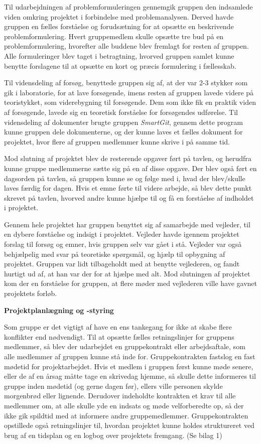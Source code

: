 Til udarbejdningen af problemformuleringen gennemgik gruppen den indsamlede viden omkring projektet i forbindelse med problemanalysen. Derved havde gruppen en fælles forståelse og forudsætning for at opsætte en beskrivende problemformulering. Hvert gruppemedlem skulle opsætte tre bud på en problemformulering, hvorefter alle buddene blev fremlagt for resten af gruppen. Alle formuleringer blev taget i betragtning, hvorved gruppen samlet kunne benytte forslagene til at opsætte en kort og præcis formulering i fællesskab.

Til vidensdeling af forsøg, benyttede gruppen sig af, at der var 2-3 stykker som gik i laboratorie, for at lave forsøgende, imens resten af gruppen lavede videre på teoristykket, som viderebygning til forsøgende. Dem som ikke fik en praktik viden af forsøgende, lavede sig en teoretisk forståelse for forsøgendes udførelse. Til vidensdeling af dokumenter brugte gruppen \textit{SmartGit}, gennem dette program kunne gruppen dele dokumenterne, og der kunne laves et fælles dokument for projektet, hvor flere af gruppen medlemmer kunne skrive i på samme tid.

Mod slutning af projektet blev de resterende opgaver ført på tavlen, og herudfra kunne gruppe medlemmerne sætte sig på en af disse opgave. Der blev også ført en dagsorden på tavlen, så gruppen kunne se og følge med i, hvad der blev/skulle laves færdig for dagen. Hvis et emne førte til videre arbejde, så blev dette punkt skrevet på tavlen, hvorved andre kunne hjælpe til og få en forståelse af indholdet i projektet. 

Gennem hele projektet har gruppen benyttet sig af samarbejde med vejleder, til en dybere forståelse og indsigt i projektet. Vejleder havde igennem projektet forslag til forsøg og emner, hvis gruppen selv var gået i stå. Vejleder var også behjælpelig med svar på teoretiske spørgsmål, og hjælp til opbygning af projektet.  Gruppen var lidt tilbageholdt med at benytte vejlederen, og fandt hurtigt ud af, at han var der for at hjælpe med alt. Mod slutningen af projektet kom der en forståelse for gruppen, at flere møder med vejlederen ville have gavnet projektets forløb.

\textbf{Projektplanlægning og -styring}

Som gruppe er det vigtigt af have en ens tankegang for ikke at skabe flere konflikter end nødvendigt. Til at opsætte fælles retningslinjer for gruppens medlemmer, så blev der udarbejdet en gruppekontrakt eller arbejdsaftale, som alle medlemmer af gruppen kunne stå inde for. Gruppekontrakten fastslog en fast mødetid for projektarbejdet. Hvis et medlem i gruppen først kunne møde senere, eller de af en årsag måtte tage en skrivedag hjemme, så skulle dette informeres til gruppe inden mødetid (og gerne dagen før), ellers ville personen skylde morgenbrød eller lignende. Derudover indeholdte kontrakten et krav til alle medlemmer om, at alle skulle yde en indsats og møde velforberedte op, så der ikke gik spildtid med at informere andre gruppemedlemmer. Gruppekontrakten opstillede også retningslinjer til, hvordan projektet kunne holdes struktureret ved brug af en tidsplan og en logbog over projektets fremgang. (Se bilag 1)

